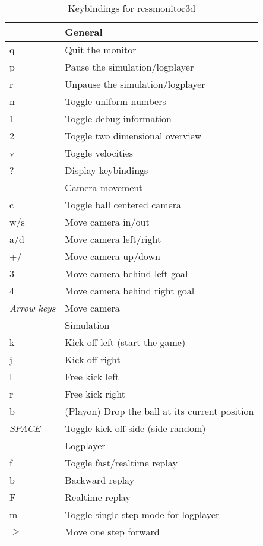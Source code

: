 \begin{table}[placement]

\caption{Keybindings for rcssmonitor3d}

\label{tabmonitorkeyshelp}
\begin{tabular}[t]{|l|l|}

\hline
& General \\
\hline
q          & Quit the monitor \\
p          & Pause the simulation/logplayer \\
r          & Unpause the simulation/logplayer \\
n          & Toggle uniform numbers \\
1          & Toggle debug information \\
2          & Toggle two dimensional overview \\
v          & Toggle velocities \\
?          & Display keybindings \\
\hline
& Camera movement \\
\hline
c          & Toggle ball centered camera \\
w/s        & Move camera in/out \\
a/d        & Move camera left/right \\
+/-        & Move camera up/down \\
3          & Move camera behind left goal \\
4          & Move camera behind right goal \\
\emph{Arrow keys} & Move camera \\
\hline
& Simulation \\
\hline
k          & Kick-off left (start the game) \\
j          & Kick-off right \\
l          & Free kick left \\
r          & Free kick right \\
b          & (Playon) Drop the ball at its current position \\
\emph{SPACE}      & Toggle kick off side (side-random) \\
\hline
& Logplayer \\
\hline
f          & Toggle fast/realtime replay \\
b          & Backward replay \\
F          & Realtime replay \\
m          & Toggle single step mode for logplayer \\
$>$        & Move one step forward \\
\hline

\end{tabular}

\end{table}

